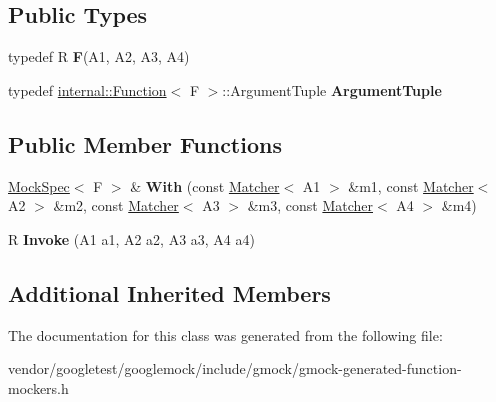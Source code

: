 \subsection*{Public Types}
\begin{DoxyCompactItemize}
\item 
typedef R {\bfseries F}(A1, A2, A3, A4)\hypertarget{classtesting_1_1internal_1_1FunctionMocker_3_01R_07A1_00_01A2_00_01A3_00_01A4_08_4_a9be04bb962edb1458c857ca8e9db9318}{}\label{classtesting_1_1internal_1_1FunctionMocker_3_01R_07A1_00_01A2_00_01A3_00_01A4_08_4_a9be04bb962edb1458c857ca8e9db9318}

\item 
typedef \hyperlink{structtesting_1_1internal_1_1Function}{internal\+::\+Function}$<$ F $>$\+::Argument\+Tuple {\bfseries Argument\+Tuple}\hypertarget{classtesting_1_1internal_1_1FunctionMocker_3_01R_07A1_00_01A2_00_01A3_00_01A4_08_4_a97576d71dfe85cbb0fc51fcaad6d4cc1}{}\label{classtesting_1_1internal_1_1FunctionMocker_3_01R_07A1_00_01A2_00_01A3_00_01A4_08_4_a97576d71dfe85cbb0fc51fcaad6d4cc1}

\end{DoxyCompactItemize}
\subsection*{Public Member Functions}
\begin{DoxyCompactItemize}
\item 
\hyperlink{classtesting_1_1internal_1_1MockSpec}{Mock\+Spec}$<$ F $>$ \& {\bfseries With} (const \hyperlink{classtesting_1_1Matcher}{Matcher}$<$ A1 $>$ \&m1, const \hyperlink{classtesting_1_1Matcher}{Matcher}$<$ A2 $>$ \&m2, const \hyperlink{classtesting_1_1Matcher}{Matcher}$<$ A3 $>$ \&m3, const \hyperlink{classtesting_1_1Matcher}{Matcher}$<$ A4 $>$ \&m4)\hypertarget{classtesting_1_1internal_1_1FunctionMocker_3_01R_07A1_00_01A2_00_01A3_00_01A4_08_4_ac29a206739844575e1b92de03be8ad29}{}\label{classtesting_1_1internal_1_1FunctionMocker_3_01R_07A1_00_01A2_00_01A3_00_01A4_08_4_ac29a206739844575e1b92de03be8ad29}

\item 
R {\bfseries Invoke} (A1 a1, A2 a2, A3 a3, A4 a4)\hypertarget{classtesting_1_1internal_1_1FunctionMocker_3_01R_07A1_00_01A2_00_01A3_00_01A4_08_4_ac20228ed7a21f43775a08fb3b1661721}{}\label{classtesting_1_1internal_1_1FunctionMocker_3_01R_07A1_00_01A2_00_01A3_00_01A4_08_4_ac20228ed7a21f43775a08fb3b1661721}

\end{DoxyCompactItemize}
\subsection*{Additional Inherited Members}


The documentation for this class was generated from the following file\+:\begin{DoxyCompactItemize}
\item 
vendor/googletest/googlemock/include/gmock/gmock-\/generated-\/function-\/mockers.\+h\end{DoxyCompactItemize}
